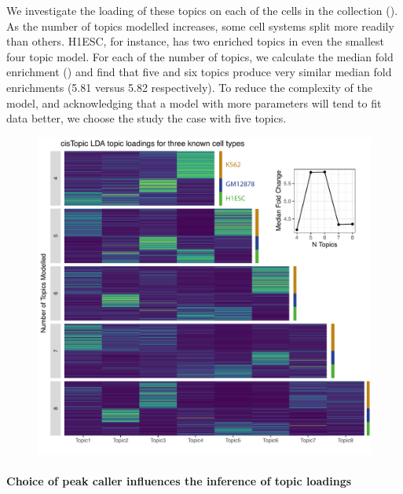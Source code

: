 We investigate the loading of these topics on each of the cells in the collection (). As the number of topics modelled increases, some cell systems split more readily than others. H1ESC, for instance, has two enriched topics in even the smallest four topic model. For each of the number of topics, we calculate the median fold enrichment () and find that five and six topics produce very similar median fold enrichments (5.81 versus 5.82 respectively). To reduce the complexity of the model, and acknowledging that a model with more parameters will tend to fit data better, we choose the study the case with five topics.  

\begin{figure}
  \centering
  \includegraphics[width=\textwidth]{plot/ch4/sc_topics.pdf}
  \label{fig:sc_topics}
\end{figure}

\paragraph{Choice of peak caller influences the inference of topic loadings}

